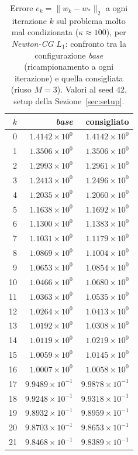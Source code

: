 \begin{table}[H]
\centering
\footnotesize
\renewcommand{\arraystretch}{0.85}
\setlength{\tabcolsep}{8pt}
\caption{Errore $e_k=\|w_k-w_*\|_2$ a ogni iterazione $k$ sul problema molto mal condizionata ($\kappa\approx 100$), per \emph{Newton-CG $L_1$}: confronto tra la configurazione \emph{base} (ricampionamento a ogni iterazione) e quella consigliata (riuso $M{=}3$). Valori al seed 42, setup della Sezione~\ref{sec:setup}.}
\label{tab:riuso_cons_veryill_nl1}
\begin{tabular}{@{}rrr@{}}
\toprule
$k$ & \emph{base} & consigliato\\
\midrule
0 & $1.4142\times10^{0}$ & $1.4142\times10^{0}$\\
1 & $1.3506\times10^{0}$ & $1.3506\times10^{0}$\\
2 & $1.2993\times10^{0}$ & $1.2961\times10^{0}$\\
3 & $1.2413\times10^{0}$ & $1.2496\times10^{0}$\\
4 & $1.2035\times10^{0}$ & $1.2060\times10^{0}$\\
5 & $1.1638\times10^{0}$ & $1.1692\times10^{0}$\\
6 & $1.1300\times10^{0}$ & $1.1383\times10^{0}$\\
7 & $1.1031\times10^{0}$ & $1.1179\times10^{0}$\\
8 & $1.0869\times10^{0}$ & $1.1004\times10^{0}$\\
9 & $1.0653\times10^{0}$ & $1.0854\times10^{0}$\\
10 & $1.0466\times10^{0}$ & $1.0680\times10^{0}$\\
11 & $1.0363\times10^{0}$ & $1.0535\times10^{0}$\\
12 & $1.0264\times10^{0}$ & $1.0413\times10^{0}$\\
13 & $1.0192\times10^{0}$ & $1.0308\times10^{0}$\\
14 & $1.0119\times10^{0}$ & $1.0219\times10^{0}$\\
15 & $1.0059\times10^{0}$ & $1.0145\times10^{0}$\\
16 & $1.0007\times10^{0}$ & $1.0058\times10^{0}$\\
17 & $9.9489\times10^{-1}$ & $9.9878\times10^{-1}$\\
18 & $9.9248\times10^{-1}$ & $9.9318\times10^{-1}$\\
19 & $9.8932\times10^{-1}$ & $9.8959\times10^{-1}$\\
20 & $9.8703\times10^{-1}$ & $9.8653\times10^{-1}$\\
21 & $9.8468\times10^{-1}$ & $9.8389\times10^{-1}$\\

\end{tabular}
\end{table}
